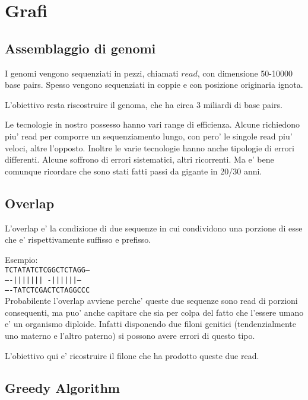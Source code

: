 \chapter{Grafi}

\section{Assemblaggio di genomi}

I genomi vengono sequenziati in pezzi, chiamati $read$, con dimensione 50-10000 base pairs.
Spesso vengono sequenziati in coppie e con posizione originaria ignota.

L'obiettivo resta riscostruire il genoma, che ha circa 3 miliardi di base pairs.

Le tecnologie in nostro possesso hanno vari range di efficienza. Alcune richiedono piu' read per comporre un sequenziamento lungo, con pero' le singole read piu' veloci, altre l'opposto.
Inoltre le varie tecnologie hanno anche tipologie di errori differenti. Alcune soffrono di errori sistematici, altri ricorrenti. Ma e' bene comunque ricordare che sono stati fatti passi da gigante in 20/30 anni.

\section{Overlap}

L'overlap e' la condizione di due sequenze in cui condividono una porzione di esse che e' rispettivamente suffisso e prefisso.

Esempio: \\

\texttt{TCTATATCTCGGCTCTAGG---}\\
\texttt{----||||||| -||||||---}\\
\texttt{----TATCTCGACTCTAGGCCC}\\

Probabilente l'overlap avviene perche' queste due sequenze sono read di porzioni consequenti, ma puo' anche capitare che sia per colpa del fatto che l'essere umano e' un organismo diploide. Infatti disponendo due filoni genitici (tendenzialmente uno materno e l'altro paterno) si possono avere errori di questo tipo.

L'obiettivo qui e' ricostruire il filone che ha prodotto queste due read.

\section{Greedy Algorithm}

